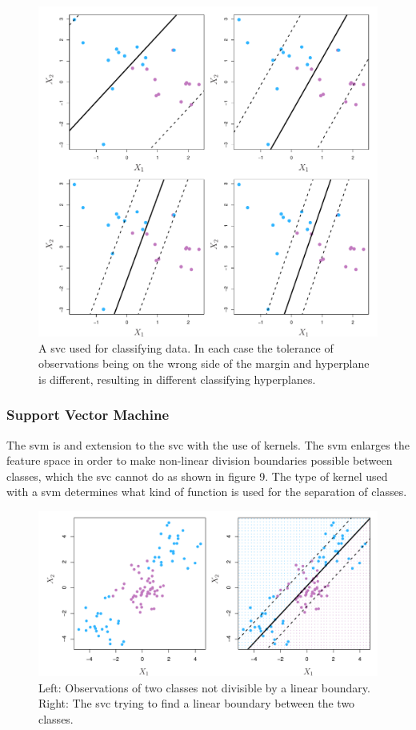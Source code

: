 \documentclass[11pt]{article}
\begin{document}
\begin{figure}[ht]
  \centering
  \includegraphics[width=12cm]{graphics/9_7.pdf}
  \caption{A \gls{svc} used for classifying data. In each case the tolerance of observations being on the wrong side of the margin and hyperplane is different, resulting in different classifying hyperplanes.}
\end{figure}

\subsubsection{Support Vector Machine}
The \gls{svm} is and extension to the \gls{svc} with the use of kernels. The \gls{svm} enlarges the feature space in order to make non-linear division boundaries possible between classes, which the \gls{svc} cannot do as shown in figure 9. The type of kernel used with a \gls{svm}\cite{KernelMethod2021} determines what kind of function is used for the separation of classes\cite{SVMKernelsScikitlearn24}.\cite{jamesSupportVectorMachines}

\begin{figure}[ht]
  \centering
  \includegraphics[width=12cm]{graphics/9_8.pdf}
  \caption{Left: Observations of two classes not divisible by a linear boundary. Right: The \gls{svc} trying to find a linear boundary between the two classes.}
\end{figure}
\end{document}
